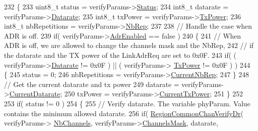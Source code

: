\begin{DoxyCode}
232 \{
233     uint8\_t status = verifyParams->\mbox{\hyperlink{structs_region_common_link_adr_req_verify_params_a7ca418fa247ab5f1df4e8b5852d8b738}{Status}};
234     int8\_t datarate = verifyParams->\mbox{\hyperlink{structs_region_common_link_adr_req_verify_params_ae2f6080f3aa0e9485c55513ca56bb24d}{Datarate}};
235     int8\_t txPower = verifyParams->\mbox{\hyperlink{structs_region_common_link_adr_req_verify_params_a037b4f849fa8ed4aa1d3c58aef2b28ec}{TxPower}};
236     int8\_t nbRepetitions = verifyParams->\mbox{\hyperlink{structs_region_common_link_adr_req_verify_params_a3b99538671d86dbfe2f6754ce6f9577a}{NbRep}};
237 
238     \textcolor{comment}{// Handle the case when ADR is off.}
239     \textcolor{keywordflow}{if}( verifyParams->\mbox{\hyperlink{structs_region_common_link_adr_req_verify_params_ab3e2fb44577c95786e11aacd56769703}{AdrEnabled}} == \textcolor{keyword}{false} )
240     \{
241         \textcolor{comment}{// When ADR is off, we are allowed to change the channels mask and the NbRep,}
242         \textcolor{comment}{// if the datarate and the TX power of the LinkAdrReq are set to 0x0F.}
243         \textcolor{keywordflow}{if}( ( verifyParams->\mbox{\hyperlink{structs_region_common_link_adr_req_verify_params_ae2f6080f3aa0e9485c55513ca56bb24d}{Datarate}} != 0x0F ) || ( verifyParams->
      \mbox{\hyperlink{structs_region_common_link_adr_req_verify_params_a037b4f849fa8ed4aa1d3c58aef2b28ec}{TxPower}} != 0x0F ) )
244         \{
245             status = 0;
246             nbRepetitions = verifyParams->\mbox{\hyperlink{structs_region_common_link_adr_req_verify_params_a92fb5546eea8bf128e56b1ad22b088f3}{CurrentNbRep}};
247         \}
248         \textcolor{comment}{// Get the current datarate and tx power}
249         datarate = verifyParams->\mbox{\hyperlink{structs_region_common_link_adr_req_verify_params_a928ed703cdac38d74d55ef5e8a45c558}{CurrentDatarate}};
250         txPower = verifyParams->\mbox{\hyperlink{structs_region_common_link_adr_req_verify_params_ac68ea6f7b6f8708b7a5a7fbf13ee3f97}{CurrentTxPower}};
251     \}
252 
253     \textcolor{keywordflow}{if}( status != 0 )
254     \{
255         \textcolor{comment}{// Verify datarate. The variable phyParam. Value contains the minimum allowed datarate.}
256         \textcolor{keywordflow}{if}( \mbox{\hyperlink{group___r_e_g_i_o_n_c_o_m_m_o_n_ga94ce5c6e759081853eb06d1dcffdab25}{RegionCommonChanVerifyDr}}( verifyParams->
      \mbox{\hyperlink{structs_region_common_link_adr_req_verify_params_a3c6d7fa8dd5ecfd55568426ded700142}{NbChannels}}, verifyParams->\mbox{\hyperlink{structs_region_common_link_adr_req_verify_params_aed7477cfc6166e3ee0499b898443426a}{ChannelsMask}}, datarate,

\end{DoxyCode}
